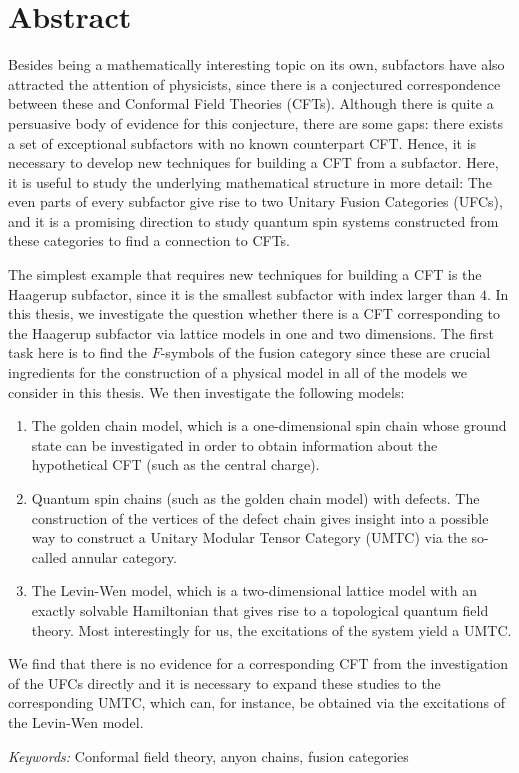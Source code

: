 \chapter*{Abstract}


Besides being a mathematically interesting topic on its own, subfactors have also attracted the attention of physicists, since there is a conjectured correspondence between these and Conformal Field Theories (CFTs). 
Although there is quite a persuasive body of evidence for this conjecture, there are some gaps: there exists a set of exceptional subfactors with no known counterpart CFT. Hence, it is necessary to develop new techniques for building a CFT from a subfactor. Here, it is useful to study the underlying mathematical structure in more detail: The even parts of every subfactor give rise to two Unitary Fusion Categories (UFCs), and it is a promising direction to study quantum spin systems constructed from these categories to find a connection to CFTs. 

The simplest example that requires new techniques for building a CFT is the Haagerup subfactor, since it is the smallest subfactor with index larger than $4$. In this thesis, we investigate the question whether there is a CFT corresponding to the Haagerup subfactor via lattice models in one and two dimensions. The first task here is to find the $F$-symbols of the fusion category since these are crucial ingredients for the construction of a physical model in all of the models we consider in this thesis. We then investigate the following models:
\begin{enumerate}
	\item The golden chain model, which is a one-dimensional spin chain whose ground state can be investigated in order to obtain information about the hypothetical CFT (such as the central charge).
	\item Quantum spin chains (such as the golden chain model) with defects. The construction of the vertices of the defect chain gives insight into a possible way to construct a Unitary Modular Tensor Category (UMTC) via the so-called annular category.
	\item The Levin-Wen model, which is a two-dimensional lattice model with an exactly solvable Hamiltonian that gives rise to a topological quantum field theory. Most interestingly for us, the excitations of the system yield a UMTC.
\end{enumerate}

We find that there is no evidence for a corresponding CFT from the investigation of the UFCs directly and it is necessary to expand these studies to the corresponding UMTC, which can, for instance, be obtained via the excitations of the Levin-Wen model.


\hspace{10pt}

\noindent
\textit{Keywords:} Conformal field theory, anyon chains, fusion categories